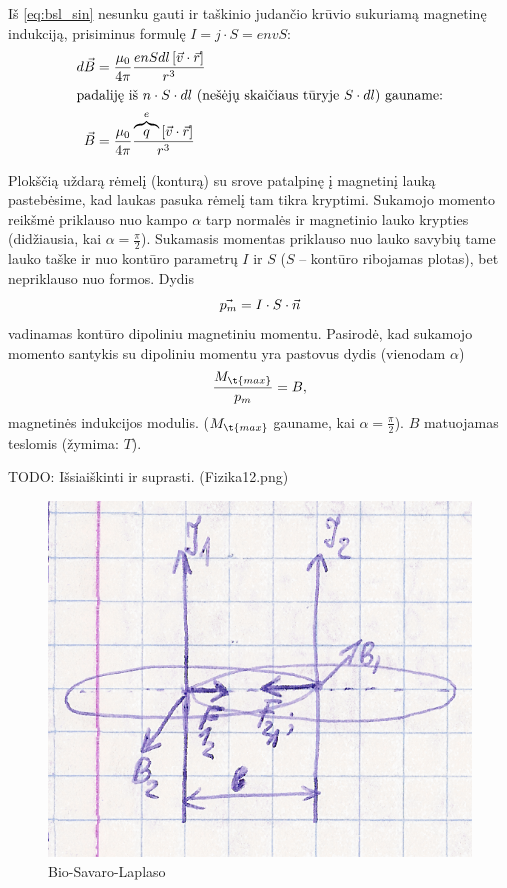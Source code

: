 Iš \ref{eq:bsl_sin} nesunku gauti ir taškinio judančio krūvio
sukuriamą magnetinę indukciją, prisiminus formulę
$I = j \cdot S = e n v S$:
\begin{align*}
  d \vec{B} &=
    \frac{\mu_{0}}{4\pi}
    \frac{e n S dl \left[ \vec{v} \cdot \vec{r} \right]}{r^{3}} \\
  \intertext{padaliję iš $n \cdot S \cdot dl$ (nešėjų skaičiaus tūryje
  $S \cdot dl$) gauname:}
  \vec{B} &=
    \frac{\mu_{0}}{4\pi}
    \frac{\overbrace{q}^{e}\left[ \vec{v} \cdot \vec{r} \right]}{r^3} \\
\end{align*}

Plokščią uždarą rėmelį (konturą) su srove patalpinę į magnetinį lauką
pastebėsime, kad laukas pasuka rėmelį tam tikra kryptimi. Sukamojo
momento reikšmė priklauso nuo kampo $\alpha$ tarp normalės ir magnetinio
lauko krypties (didžiausia, kai $\alpha = \frac{\pi}{2}$). Sukamasis
momentas priklauso nuo lauko savybių tame lauko taške ir nuo kontūro
parametrų $I$ ir $S$ ($S$ – kontūro ribojamas plotas), bet
nepriklauso nuo formos. Dydis
\begin{equation*}
  \vec{p_{m}} = I \cdot S \cdot \vec{n} \\
\end{equation*}
vadinamas kontūro dipoliniu magnetiniu momentu. Pasirodė, kad sukamojo
momento santykis su dipoliniu momentu yra pastovus dydis (vienodam
$\alpha$)
\begin{equation*}
  \frac{M_{\t{max}}}{p_{m}} = B,
\end{equation*}
magnetinės indukcijos modulis. ($M_{\t{max}}$ gauname, kai
$\alpha = \frac{\pi}{2}$). $B$ matuojamas teslomis (žymima: $T$).

TODO: Išsiaiškinti ir suprasti. (Fizika12.png)


\begin{figure}[H]
  \begin{center}
    \includegraphics[height=0.5\textwidth]{images/bio_savaro_laplaso.png}
  \end{center}
  \caption{Bio-Savaro-Laplaso}
  \label{fig:bio_savaro_laplaso}
\end{figure}

